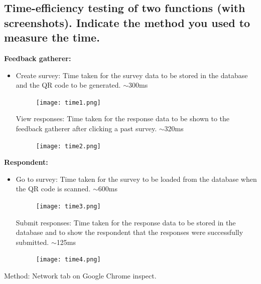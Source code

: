 \documentclass[letterpaper, 12 pt, conference]{ieeeconf}
\begin{document}
\subsection{Time-eﬀiciency testing of two functions (with screenshots). Indicate the method you used to measure the time.}
\newline

\textbf{Feedback gatherer:}
\begin{itemize}
    \item[] Create survey: Time taken for the survey data to be stored in the database and the QR code to be generated. \(\sim \)300ms
    \begin{figure}[h]
        \centering
        \texttt{[image: time1.png]}
\end{figure}

View responses: Time taken for the response data to be shown to the feedback gatherer after clicking a past survey. \(\sim \)320ms
\begin{figure}[h]
        \centering
        \texttt{[image: time2.png]}
\end{figure}
\end{itemize}
\newline
\hfill \break

\clearpage
\textbf{Respondent:}
\begin{itemize}
    \item[] Go to survey: Time taken for the survey to be loaded from the database when the QR code is scanned. \(\sim \)600ms
    \begin{figure}[h]
        \centering
        \texttt{[image: time3.png]}
\end{figure}

Submit responses: Time taken for the response data to be stored in the database and to show the respondent that the responses were successfully submitted. \(\sim \)125ms
\begin{figure}[h]
        \centering
        \texttt{[image: time4.png]}
\end{figure}

\end{itemize}
\newline
\hfill \break
Method: Network tab on Google Chrome inspect.


\addtolength{\textheight}{-12cm}


\end{document}

